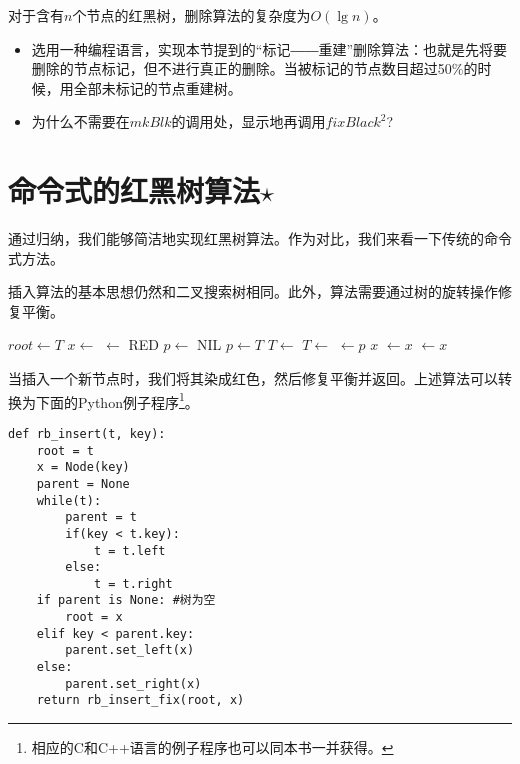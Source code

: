 \documentclass[UTF8]{article}
\begin{document}
对于含有$n$个节点的红黑树，删除算法的复杂度为$O(\lg n)$。

\begin{Exercise}

\begin{itemize}
\item 选用一种编程语言，实现本节提到的“标记――重建”删除算法：也就是先将要删除的节点标记，但不进行真正的删除。当被标记的节点数目超过50\%的时候，用全部未标记的节点重建树。
\item 为什么不需要在$mkBlk$的调用处，显示地再调用$fixBlack^2$?
\end{itemize}

\end{Exercise}

\section{命令式的红黑树算法$\star$}

通过归纳，我们能够简洁地实现红黑树算法。作为对比，我们来看一下传统的命令式方法。

插入算法的基本思想仍然和二叉搜索树相同。此外，算法需要通过树的旋转操作修复平衡。

\begin{algorithmic}[1]
  \State $root \gets T$
  \State $x \gets$ 
  \State {} $\gets$ RED
  \State $p \gets$ NIL
    \State $p \gets T$
      \State $T \gets $ 
    \Else
      \State $T \gets $ 
    \EndIf
  \EndWhile
  \State {} $\gets p$
   
    \State \Return $x$
    \State {} $\gets x$
  \Else
    \State {} $\gets x$
  \EndIf
  \State \Return {}
\EndFunction
\end{algorithmic}

当插入一个新节点时，我们将其染成红色，然后修复平衡并返回。上述算法可以转换为下面的Python例子程序\footnote{相应的C和C++语言的例子程序也可以同本书一并获得。}。

\lstset{language=Python}
\begin{lstlisting}
def rb_insert(t, key):
    root = t
    x = Node(key)
    parent = None
    while(t):
        parent = t
        if(key < t.key):
            t = t.left
        else:
            t = t.right
    if parent is None: #树为空
        root = x
    elif key < parent.key:
        parent.set_left(x)
    else:
        parent.set_right(x)
    return rb_insert_fix(root, x)
\end{lstlisting}
\end{document}
